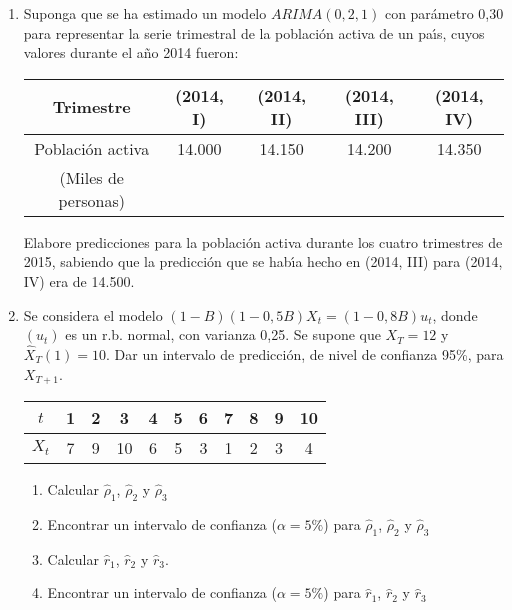\begin{enumerate}
\item Suponga que se ha estimado un modelo $ARIMA (0, 2, 1)$ con par\'{a}metro 0,30 para representar la serie trimestral de la poblaci\'{o}n activa de un pa\'{\i}s, cuyos valores durante el a\~{n}o 2014 fueron:

\begin{center}
\begin{tabular}{@{}ccccc@{}}
\toprule
\textbf{Trimestre} & 
\textbf{(2014, I)}& 
\textbf{(2014, II)}& 
\textbf{(2014, III)}& 
\textbf{(2014, IV)} \\
\midrule
Poblaci\'{o}n activa & 14.000& 14.150& 14.200& 14.350 \\
(Miles de personas)& \\
\bottomrule
\end{tabular}
\end{center}

Elabore predicciones para la poblaci\'{o}n activa durante los cuatro 
trimestres de 2015, sabiendo que la predicci\'{o}n que se hab\'{\i}a hecho 
en (2014, III) para (2014, IV) era de 14.500.

\item Se considera el modelo $(1-B) (1-0,5B) X_{t}=(1-0,8B) u_{t}$, donde $(u_{t})$ es un r.b. normal, con varianza 0,25. Se supone que $X_{T} =12$ y $\widehat{X}_{T} (1)=10$. Dar un intervalo de predicci\'{o}n, de nivel de confianza 95{\%}, para $X_{T+1} $.

\begin{center}
\begin{tabular}{@{}ccccccccccc@{}}
\toprule
$t$& 1& 2& 3& 4& 5& 6& 7& 8& 9& 10 \\
\midrule
$X_{t}$& 7& 9& 10& 6& 5& 3& 1& 2& 3& 4 \\
\bottomrule
\end{tabular}
\end{center}

\begin{enumerate}
 \item Calcular $\widehat{\rho}_{1}$, $\widehat{\rho}_{2}$ y $\widehat{\rho}_{3}$
\item Encontrar un intervalo de confianza ($\alpha =5\%$) para $\widehat{\rho}_{1}$, $\widehat{\rho}_{2}$ y $\widehat{\rho}_{3}$
\item Calcular $\widehat{r}_{1}$, $\widehat{r}_{2}$ y $\widehat{r}_{3}$.
\item Encontrar un intervalo de confianza ($\alpha =5\%$) para $\widehat{r}_{1}$, $\widehat{r}_{2}$ y $\widehat{r}_{3}$
\end{enumerate}


\end{enumerate}
